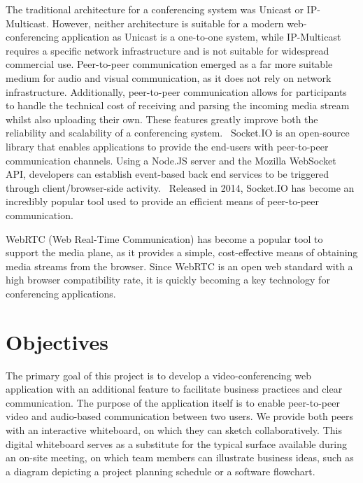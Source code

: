 The traditional architecture for a conferencing system was Unicast or IP-Multicast. However, neither architecture is suitable for a modern web-conferencing application as Unicast is a one-to-one system, while IP-Multicast requires a specific network infrastructure and is not suitable for widespread commercial use. Peer-to-peer communication emerged as a far more suitable medium for audio and visual communication, as it does not rely on network infrastructure. Additionally, peer-to-peer communication allows for participants to handle the technical cost of receiving and parsing the incoming media stream whilst also uploading their own. These features greatly improve both the reliability and scalability of a conferencing system.~\cite{apu2017p2p} Socket.IO is an open-source library that enables applications to provide the end-users with peer-to-peer communication channels. Using a Node.JS server and the Mozilla WebSocket API, developers can establish event-based back end services to be triggered through client/browser-side activity.~\cite{arrachequesne_2021} Released in 2014, Socket.IO has become an incredibly popular tool used to provide an efficient means of peer-to-peer communication.  

WebRTC (Web Real-Time Communication) has become a popular tool to support the media plane, as it provides a simple, cost-effective means of obtaining media streams from the browser. Since WebRTC is an open web standard with a high browser compatibility rate, it is quickly becoming a key technology for conferencing applications.   

\section{Objectives}
The primary goal of this project is to develop a video-conferencing web application with an additional feature to facilitate business practices and clear communication. The purpose of the application itself is to enable peer-to-peer video and audio-based communication between two users. We provide both peers with an interactive whiteboard, on which they can sketch collaboratively. This digital whiteboard serves as a substitute for the typical surface available during an on-site meeting, on which team members can illustrate business ideas, such as a diagram depicting a project planning schedule or a software flowchart. 

